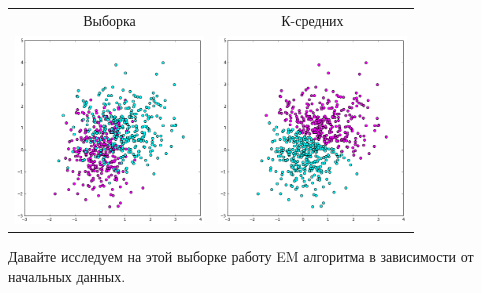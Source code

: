 \documentclass[12pt, a4paper]{article}
\begin{document}
			\begin{center}
			\begin{tabular}{c c}
				Выборка & К-средних \\

				\includegraphics[width=5cm]{4par_orig_bad.png} &
				\includegraphics[width=5cm]{4par_kmean_bad.png} \\
			\end{tabular}
			\end{center}

			Давайте исследуем на этой выборке работу EM алгоритма в зависимости от начальных данных.
\end{document}
